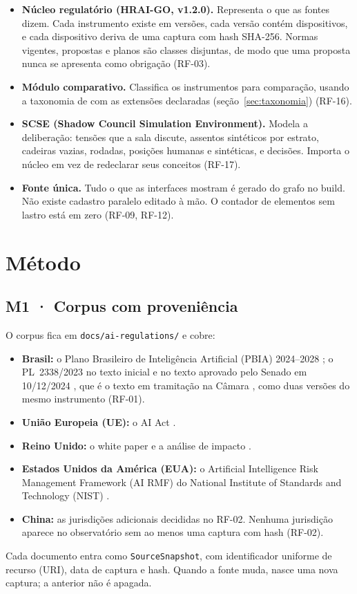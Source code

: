 \documentclass[12pt,a4paper,oneside,english,brazil]{abntex2}
\newcommand{\rf}[1]{{\footnotesize(#1)}}
\begin{document}
\begin{itemize}[leftmargin=*]
  \item \textbf{Núcleo regulatório (HRAI-GO, v1.2.0).} Representa o que as fontes dizem. Cada instrumento existe em versões, cada versão contém dispositivos, e cada dispositivo deriva de uma captura com hash SHA-256. Normas vigentes, propostas e planos são classes disjuntas, de modo que uma proposta nunca se apresenta como obrigação \rf{RF-03}.
  \item \textbf{Módulo comparativo.} Classifica os instrumentos para comparação, usando a taxonomia de  com as extensões declaradas (seção~\ref{sec:taxonomia}) \rf{RF-16}.
  \item \textbf{SCSE (Shadow Council Simulation Environment).} Modela a deliberação: tensões que a sala discute, assentos sintéticos por estrato, cadeiras vazias, rodadas, posições humanas e sintéticas, e decisões. Importa o núcleo em vez de redeclarar seus conceitos \rf{RF-17}.
  \item \textbf{Fonte única.} Tudo o que as interfaces mostram é gerado do grafo no build. Não existe cadastro paralelo editado à mão. O contador de elementos sem lastro está em zero \rf{RF-09, RF-12}.
\end{itemize}

\chapter{Método}

\section{M1 · Corpus com proveniência}
O corpus fica em \texttt{docs/ai-regulations/} e cobre:
\begin{itemize}[leftmargin=*]
  \item \textbf{Brasil:} o Plano Brasileiro de Inteligência Artificial (PBIA) 2024--2028 \cite{pbia2025}; o PL~2338/2023 no texto inicial \cite{pl2338-2023} e no texto aprovado pelo Senado em 10/12/2024 \cite{pl2338-2024}, que é o texto em tramitação na Câmara \cite{camara-pl2338}, como duas versões do mesmo instrumento \rf{RF-01}.
  \item \textbf{União Europeia (UE):} o AI Act \cite{aiact2024}.
  \item \textbf{Reino Unido:} o white paper \cite{uk-proinnovation2023} e a análise de impacto \cite{uk-impact2023}.
  \item \textbf{Estados Unidos da América (EUA):} o Artificial Intelligence Risk Management Framework (AI RMF) do National Institute of Standards and Technology (NIST) \cite{nist-ai-rmf2023}.
  \item \textbf{China:} as jurisdições adicionais decididas no RF-02. Nenhuma jurisdição aparece no observatório sem ao menos uma captura com hash \rf{RF-02}.
\end{itemize}
Cada documento entra como \texttt{SourceSnapshot}, com identificador uniforme de recurso (URI), data de captura e hash. Quando a fonte muda, nasce uma nova captura; a anterior não é apagada.
\end{document}
